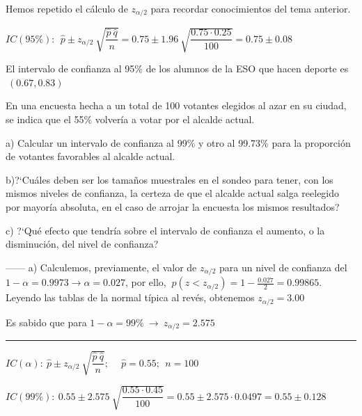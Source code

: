 \vspace{2mm} \footnotesize{\textcolor{gris}{Hemos repetido el cálculo de $z_{\alpha/2}$ para recordar conocimientos del tema anterior}}\normalsize{.}

\vspace{2mm} $IC(95\%):\ \ \widehat p \pm z_{\alpha/2}\ \sqrt{\dfrac{\hat p \ \hat q}{n}}=0.75 \pm 1.96 \ \sqrt{\dfrac{0.75\cdot 0.25}{100}}=0.75\pm 0.08$

\vspace{2mm} El intervalo de confianza al 95\% de los alumnos de la ESO que hacen deporte es $\ (0.67,0.83)$

\vspace{5mm} %
\begin{ejemplo}
\begin{ejer}
	En una encuesta hecha a un total de 100 votantes elegidos al azar en su ciudad, se indica que el 55\% volvería a votar por el alcalde actual.

a) Calcular un intervalo de confianza al 99\% y otro al 99.73\% para la proporción de votantes favorables al alcalde actual.

b)?`Cuáles deben ser los tamaños muestrales en el sondeo para tener, con los mismos niveles de confianza, la certeza de que el alcalde actual salga reelegido por mayoría absoluta, en el caso de arrojar la encuesta los mismos resultados? 

c) ?`Qué efecto que tendría sobre el intervalo de confianza el aumento, o la disminución, del nivel de confianza? 
\end{ejer}	
\end{ejemplo}

\vspace{2mm} ------ a) Calculemos, previamente, el valor de $z_{\alpha/2}$ para un nivel de confianza del $1-\alpha=0.9973 \to \alpha=0.027$, por ello, $\ p(z<z_{\alpha/2})=1-\frac {0.027}2=0.99865$. Leyendo las tablas de la normal típica al revés, obtenemos $z_{\alpha/2}=3.00$

\vspace{2mm} Es sabido que para $1-\alpha=99\% \ \to \ z_{\alpha/2}=2.575$

\rule{150pt}{0.1pt}

\vspace{2mm} $IC(\alpha):\ \widehat p \pm z_{\alpha/2}\ \sqrt{ \dfrac{\hat p\ \hat q}{n}}; \ \quad \widehat p=0.55;\ \ n=100$

\vspace{2mm}  $IC(99\%):\ 0.55  \pm 2.575 \ \sqrt{ \dfrac{0.55 \cdot 0.45}{100}} = 0.55\pm 2.575\cdot 0.0497=0.55\pm 0.128$

